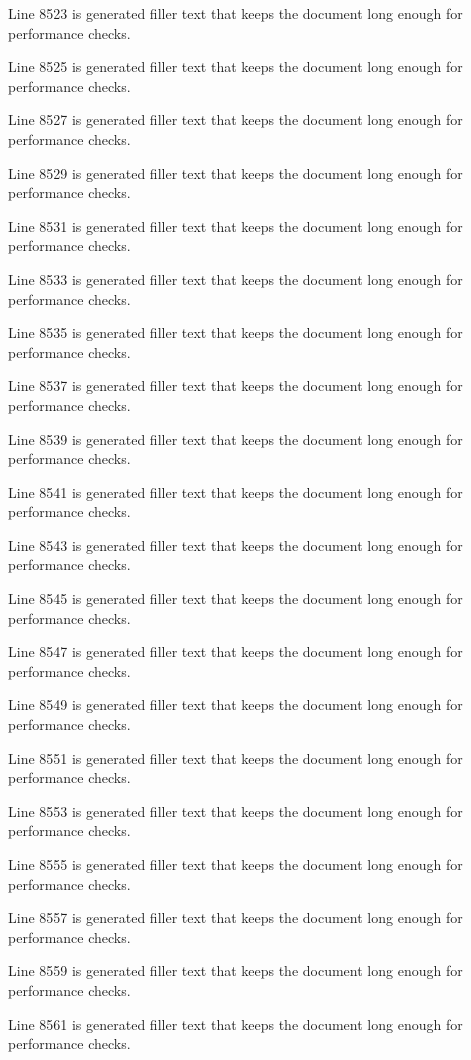 Line 8523 is generated filler text that keeps the document long enough for performance checks.

Line 8525 is generated filler text that keeps the document long enough for performance checks.

Line 8527 is generated filler text that keeps the document long enough for performance checks.

Line 8529 is generated filler text that keeps the document long enough for performance checks.

Line 8531 is generated filler text that keeps the document long enough for performance checks.

Line 8533 is generated filler text that keeps the document long enough for performance checks.

Line 8535 is generated filler text that keeps the document long enough for performance checks.

Line 8537 is generated filler text that keeps the document long enough for performance checks.

Line 8539 is generated filler text that keeps the document long enough for performance checks.

Line 8541 is generated filler text that keeps the document long enough for performance checks.

Line 8543 is generated filler text that keeps the document long enough for performance checks.

Line 8545 is generated filler text that keeps the document long enough for performance checks.

Line 8547 is generated filler text that keeps the document long enough for performance checks.

Line 8549 is generated filler text that keeps the document long enough for performance checks.

Line 8551 is generated filler text that keeps the document long enough for performance checks.

Line 8553 is generated filler text that keeps the document long enough for performance checks.

Line 8555 is generated filler text that keeps the document long enough for performance checks.

Line 8557 is generated filler text that keeps the document long enough for performance checks.

Line 8559 is generated filler text that keeps the document long enough for performance checks.

Line 8561 is generated filler text that keeps the document long enough for performance checks.

